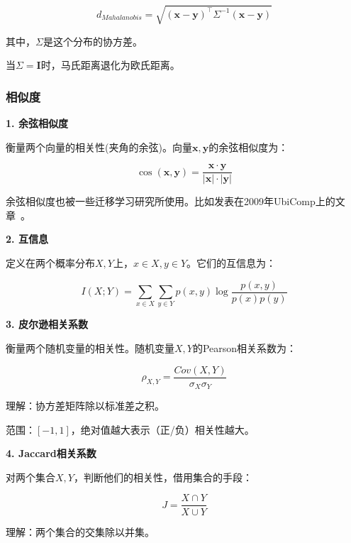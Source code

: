 \begin{equation}
	\label{eq-dist-maha}
	d_{Mahalanobis}=\sqrt{(\mathbf{x}-\mathbf{y})^\top \Sigma^{-1} (\mathbf{x}-\mathbf{y})}
\end{equation}

其中，$\Sigma$是这个分布的协方差。

当$\Sigma=\mathbf{I}$时，马氏距离退化为欧氏距离。

\subsubsection{相似度}

\textbf{1. 余弦相似度}

衡量两个向量的相关性(夹角的余弦)。向量$\mathbf{x},\mathbf{y}$的余弦相似度为：

\begin{equation}
	\label{eq-dist-cosine}
	\cos (\mathbf{x},\mathbf{y}) = \frac{\mathbf{x} \cdot \mathbf{y}}{|\mathbf{x}|\cdot |\mathbf{y}|}
\end{equation}

余弦相似度也被一些迁移学习研究所使用。比如发表在2009年UbiComp上的文章~\cite{zheng2009cross}。

\textbf{2. 互信息}

定义在两个概率分布$X,Y$上，$x \in X, y \in Y$。它们的互信息为：

\begin{equation}
	\label{eq-dist-info}
	I(X;Y)=\sum_{x \in X} \sum_{y \in Y} p(x,y) \log \frac{p(x,y)}{p(x)p(y)}
\end{equation}

\textbf{3. 皮尔逊相关系数}

衡量两个随机变量的相关性。随机变量$X,Y$的Pearson相关系数为：

\begin{equation}
	\label{eq-dist-pearson}
	\rho_{X,Y}=\frac{Cov(X,Y)}{\sigma_X \sigma_Y}
\end{equation}

理解：协方差矩阵除以标准差之积。

范围：$[-1,1]$，绝对值越大表示（正/负）相关性越大。

\textbf{4. Jaccard相关系数}

对两个集合$X,Y$，判断他们的相关性，借用集合的手段：

\begin{equation}
	\label{eq-dist-jaccard}
	J=\frac{X \cap Y}{X \cup Y}
\end{equation}

理解：两个集合的交集除以并集。

